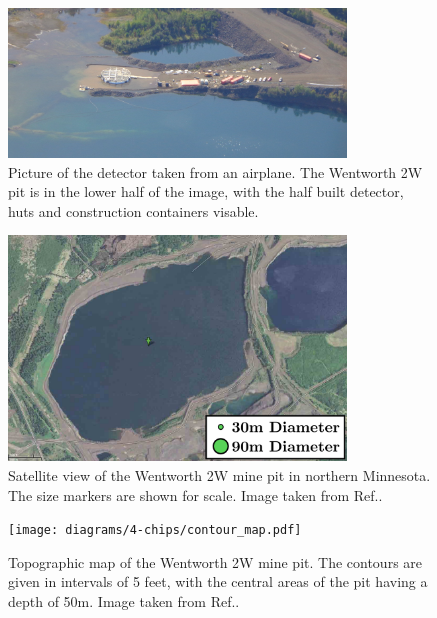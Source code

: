 \begin{figure}
    \includegraphics[width=0.8\textwidth]{diagrams/4-chips/from_the_sky.jpg}
    \caption[Picture of the \chips detector from the air.]
    {Picture of the \chips detector taken from an airplane. The Wentworth 2W pit is in the lower
        half of the image, with the half built detector, huts and construction containers visable.}
    \label{fig:from_the_sky}
\end{figure}

\begin{figure}
    \includegraphics[width=0.8\textwidth]{diagrams/4-chips/location.png}
    \caption[Satellite view of the Wentworth 2W mine pit.]
    {Satellite view of the Wentworth 2W mine pit in northern Minnesota.
        The size markers are shown for scale. Image taken from Ref.\cite{adamson2013}.}
    \label{fig:location}
\end{figure}

\begin{figure}
    \texttt{[image: diagrams/4-chips/contour\_map.pdf]}
    \caption[Topographic map of the Wentworth 2W mine pit.]
    {Topographic map of the Wentworth 2W mine pit. The contours are given in intervals of 5 feet,
        with the central areas of the pit having a depth of 50m. Image taken from Ref.\cite{adamson2013}.}
    \label{fig:contour_map}
\end{figure}

